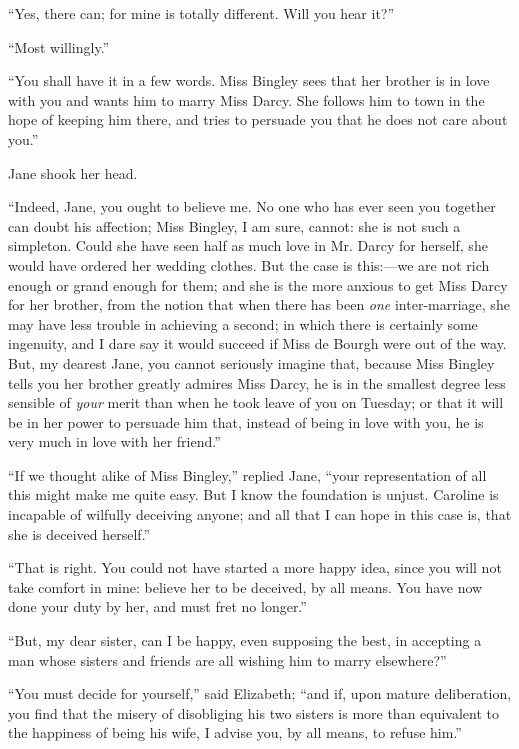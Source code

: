 ``Yes, there can; for mine is totally different. Will you hear it?''

``Most willingly.''

``You shall have it in a few words. Miss Bingley sees that her brother is in love with you and wants him to marry Miss Darcy. She follows him to town in the hope of keeping him there, and tries to persuade you that he does not care about you.''

Jane shook her head.

``Indeed, Jane, you ought to believe me. No one who has ever seen you together can doubt his affection; Miss Bingley, I am sure, cannot: she is not such a simpleton. Could she have seen half as much love in Mr. Darcy for herself, she would have ordered her wedding clothes. But the case is this:---we are not rich enough or grand enough for them; and she is the more anxious to get Miss Darcy for her brother, from the notion that when there has been \textit{one} inter-marriage, she may have less trouble in achieving a second; in which there is certainly some ingenuity, and I dare say it would succeed if Miss de Bourgh were out of the way. But, my dearest Jane, you cannot seriously imagine that, because Miss Bingley tells you her brother greatly admires Miss Darcy, he is in the smallest degree less sensible of \textit{your} merit than when he took leave of you on Tuesday; or that it will be in her power to persuade him that, instead of being in love with you, he is very much in love with her friend.''

``If we thought alike of Miss Bingley,'' replied Jane, ``your representation of all this might make me quite easy. But I know the foundation is unjust. Caroline is incapable of wilfully deceiving anyone; and all that I can hope in this case is, that she is deceived herself.''

``That is right. You could not have started a more happy idea, since you will not take comfort in mine: believe her to be deceived, by all means. You have now done your duty by her, and must fret no longer.''

``But, my dear sister, can I be happy, even supposing the best, in accepting a man whose sisters and friends are all wishing him to marry elsewhere?''

``You must decide for yourself,'' said Elizabeth; ``and if, upon mature deliberation, you find that the misery of disobliging his two sisters is more than equivalent to the happiness of being his wife, I advise you, by all means, to refuse him.''

